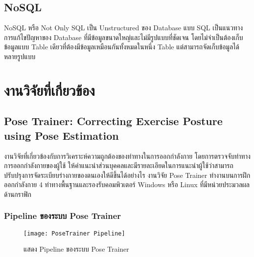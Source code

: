 \subsection{NoSQL}
NoSQL หรือ Not Only SQL เป็น Unstructured ของ Database แบบ SQL เป็นแนวทางการแก้ไขปัญหาของ Database ที่มีข้อมูลขนาดใหญ่และไม่มีรูปแบบที่ชัดเจน โดยไม่จำเป็นต้องเก็บข้อมูลแบบ Table เดียวที่ต้องมีข้อมูลเหมือนกันทั้งหมดในหนึ่ง Table แต่สามารถจัดเก็บข้อมูลได้หลายรูปแบบ

\section{งานวิจัยที่เกี่ยวข้อง}

\subsection{Pose Trainer: Correcting Exercise Posture using Pose Estimation}
งานวิจัยที่เกี่ยวข้องกับการวิเคราะห์ความถูกต้องของท่าทางในการออกกำลังกาย โดยการตรวจจับท่าทางการออกกำลังกายของผู้ใช้ ให้คำแนะนำส่วนบุคคลและมีรายละเอียดในการแนะนำผู้ใช้ว่าสามารถปรับปรุงการจัดระเบียบร่างกายของตนเองให้ดีขึ้นได้อย่างไร งานวิจัย Pose Trainer ทำงานบนการฝึกออกกำลังกาย 4 ท่าทางพื้นฐานและรองรับคอมพิวเตอร์ Windows หรือ Linux ที่มีหน่วยประมวลผลด้านกราฟิก
\subsubsection{Pipeline ของระบบ Pose Trainer}
\begin{figure}
    \texttt{[image: PoseTrainer Pipeline]}
    \caption{แสดง Pipeline ของระบบ Pose Trainer}
\end{figure}

